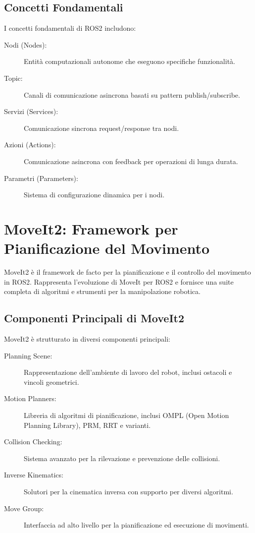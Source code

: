 \documentclass[12pt,a4paper,twoside,openright]{book}
\begin{document}
\subsection{Concetti Fondamentali}

I concetti fondamentali di ROS2 includono:

\begin{description}
    \item[Nodi (Nodes):] Entità computazionali autonome che eseguono specifiche funzionalità.
    \item[Topic:] Canali di comunicazione asincrona basati su pattern publish/subscribe.
    \item[Servizi (Services):] Comunicazione sincrona request/response tra nodi.
    \item[Azioni (Actions):] Comunicazione asincrona con feedback per operazioni di lunga durata.
    \item[Parametri (Parameters):] Sistema di configurazione dinamica per i nodi.
\end{description}

\section{MoveIt2: Framework per Pianificazione del Movimento}

MoveIt2 è il framework de facto per la pianificazione e il controllo del movimento in ROS2. Rappresenta l'evoluzione di MoveIt per ROS2 e fornisce una suite completa di algoritmi e strumenti per la manipolazione robotica.

\subsection{Componenti Principali di MoveIt2}

MoveIt2 è strutturato in diversi componenti principali:

\begin{description}
    \item[Planning Scene:] Rappresentazione dell'ambiente di lavoro del robot, inclusi ostacoli e vincoli geometrici.
    \item[Motion Planners:] Libreria di algoritmi di pianificazione, inclusi OMPL (Open Motion Planning Library), PRM, RRT e varianti.
    \item[Collision Checking:] Sistema avanzato per la rilevazione e prevenzione delle collisioni.
    \item[Inverse Kinematics:] Solutori per la cinematica inversa con supporto per diversi algoritmi.
    \item[Move Group:] Interfaccia ad alto livello per la pianificazione ed esecuzione di movimenti.
\end{description}
\end{document}
